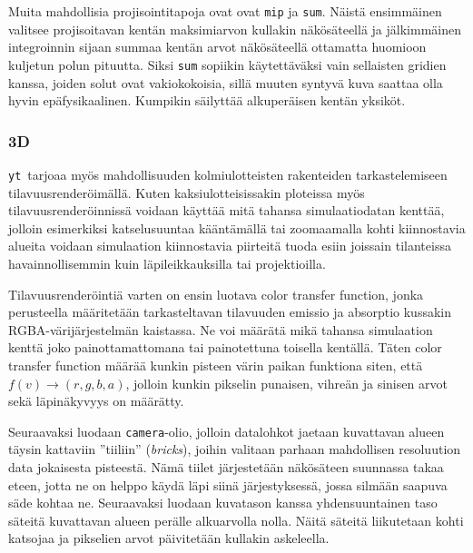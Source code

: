\documentclass[12pt,a4paper]{article}
\newcommand{\yt}{\texttt{yt}}
\begin{document}
Muita mahdollisia projisointitapoja ovat ovat \texttt{mip} ja \texttt{sum}. Näistä ensimmäinen valitsee projisoitavan kentän maksimiarvon kullakin näkösäteellä ja jälkimmäinen integroinnin sijaan summaa kentän arvot näkösäteellä ottamatta huomioon kuljetun polun pituutta. Siksi \texttt{sum} sopiikin käytettäväksi vain sellaisten gridien kanssa, joiden solut ovat vakiokokoisia, sillä muuten syntyvä kuva saattaa olla hyvin epäfysikaalinen. Kumpikin säilyttää alkuperäisen kentän yksiköt. \cite{sliceproj, projection}

\subsubsection{3D}
\yt\ tarjoaa myös mahdollisuuden kolmiulotteisten rakenteiden tarkastelemiseen tilavuusrenderöimällä. Kuten kaksiulotteisissakin ploteissa myös tilavuusrenderöinnissä voidaan käyttää mitä tahansa simulaatiodatan kenttää, jolloin esimerkiksi katselusuuntaa kääntä\-mällä tai zoomaamalla kohti kiinnostavia alueita voidaan simulaation kiinnostavia piirteitä tuoda esiin joissain tilanteissa havainnollisemmin kuin läpileikkauksilla tai projektioilla. \cite{volume}

Tilavuusrenderöintiä varten on ensin luotava color transfer function, %
jonka perusteella määritetään tarkasteltavan tilavuuden emissio ja absorptio kussakin RGBA-väri\-järjes\-telmän kaistassa. Ne voi määrätä mikä tahansa simulaation kenttä joko painottamattomana tai painotettuna toisella kentällä. Täten color transfer function määrää kunkin pisteen värin paikan funktiona siten, että $f(v) \rightarrow (r, g, b, a)$, jolloin kunkin pikselin punaisen, vihreän ja sinisen arvot sekä läpinäkyvyys on määrätty. \cite{volume}

Seuraavaksi luodaan \texttt{camera}-olio, jolloin datalohkot jaetaan kuvattavan alueen täysin kattaviin ''tiiliin'' (\textit{bricks}), joihin valitaan parhaan mahdollisen resoluution data jokaisesta pisteestä. Nämä tiilet järjestetään näkösäteen suunnassa takaa eteen, jotta ne on helppo käydä läpi siinä järjestyksessä, jossa silmään saapuva säde kohtaa ne. Seuraavaksi luodaan kuvatason kanssa yhdensuuntainen taso säteitä kuvattavan alueen perälle alkuarvolla nolla. Näitä säteitä liikutetaan kohti katsojaa ja pikselien arvot päivitetään kullakin askeleella. \cite{volume}
\end{document}
